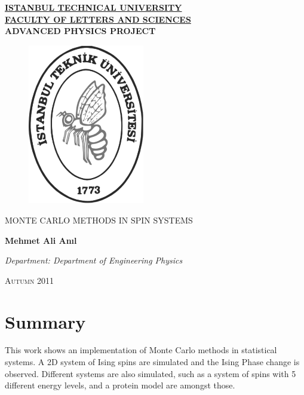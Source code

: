     \begin{center}
  \doublespacing
  \underline{\textbf{ISTANBUL TECHNICAL UNIVERSITY}} \\ \underline{\textbf{FACULTY OF LETTERS AND SCIENCES}} \\ \textbf{ADVANCED PHYSICS PROJECT}
  \vspace{1.5cm}
  
  \begin{figure}[H]
  \center
  \includegraphics[height = 7cm]{fig/ITUgr.eps}
  \end{figure}
  
  \vspace{2.5cm}
   MONTE CARLO METHODS IN SPIN SYSTEMS
   
   \vspace{2cm}
  \textbf{Mehmet Ali Anıl}
  
  
  \vfill
  \emph{Department: Department of Engineering Physics}
  
  \vspace{2cm}
  \textsc{Autumn} 2011
   
  
    \end{center}

\setlength{\parindent}{0in}


\newpage
{} \label{summary} 
\newpage
\chapter*{Summary}
This work shows an implementation of Monte Carlo methods in statistical systems. A 2D system of Ising spins are simulated and the Ising Phase change is observed. Different systems are also simulated, such as a system of spins with 5 different energy levels, and a protein model are amongst those.
  
\newpage
\printnomenclature 
\newpage
\tableofcontents
\newpage
{} \label{nomenclature}
\printnomenclature 
\newpage
{} \label{listoffig}
\listoffigures
\newpage
\thispagestyle{empty}
\mbox{}
\newpage
\setcounter{page}{1}
